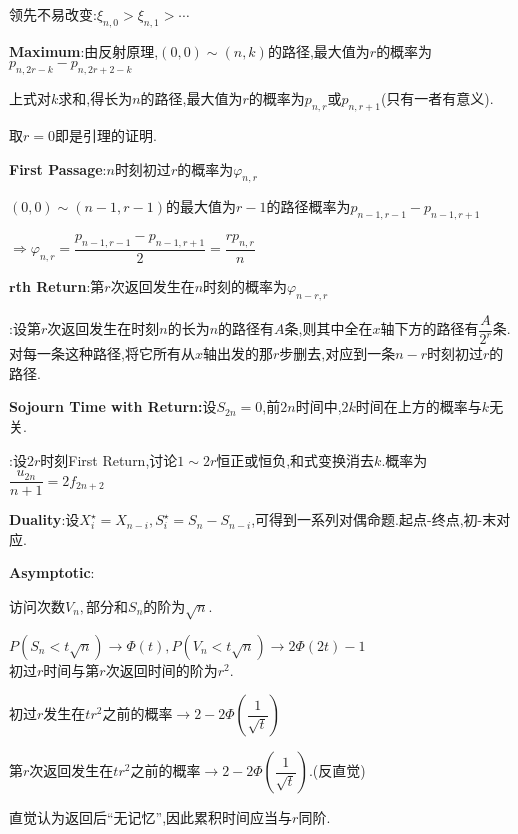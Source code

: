 领先不易改变:$ \xi_{n,0}>\xi_{n,1}>\cdots $
\vspace{0.6cm}

\textbf{Maximum}:由反射原理,$ (0,0)\sim (n,k)$的路径,最大值为$ r$的概率为$ p_{n,2r-k}-p_{n,2r+2-k}$

上式对$ k$求和,得长为$ n$的路径,最大值为$ r$的概率为$ p_{n,r}或p_{n,r+1}$(只有一者有意义).

取$ r=0$即是引理的证明.
\vspace{0.6cm}

\textbf{First Passage}:$ n$时刻初过$ r$的概率为$\varphi_{n,r}$

$(0,0)\sim (n-1,r-1) $的最大值为$ r-1$的路径概率为$ p_{n-1,r-1}-p_{n-1,r+1}$

$ \Rightarrow \varphi_{n,r} = \dfrac{p_{n-1,r-1}-p_{n-1,r+1}}{2} = \dfrac{rp_{n,r}}{n}$
\vspace{0.6cm}

\textbf{$ \mathbf{r}$th Return}:第$ r$次返回发生在$ n$时刻的概率为$ \varphi_{n-r,r}$

\proof:设第$ r$次返回发生在时刻$ n$的长为$ n$的路径有$ A$条,则其中全在$ x$轴下方的路径有$ \dfrac{A}{2^r}$条.
对每一条这种路径,将它所有从$ x$轴出发的那$ r$步删去,对应到一条$ n-r$时刻初过$ r$的路径.
\vspace{0.6cm}

\textbf{Sojourn Time with Return:}设$ S_{2n}=0$,前$ 2n$时间中,$ 2k$时间在上方的概率与$ k$无关.

\proof:设$ 2r$时刻First Return,讨论$ 1\sim 2r$恒正或恒负,和式变换消去$ k$.概率为$ \dfrac{u_{2n}}{n+1}=2f_{2n+2}$
\vspace{0.6cm}

\textbf{Duality}:设$ X_i^\star = X_{n-i},S_{i}^\star = S_n-S_{n-i}$,可得到一系列对偶命题.起点-终点,初-末对应.
\vspace{0.6cm}

\textbf{Asymptotic}:

访问次数$ V_n,$部分和$ S_n$的阶为$ \sqrt{n}.$

$  P(S_n < t\sqrt{n})\to \Phi(t), P(V_n < t\sqrt{n}) \to 2\Phi(2t) -1$
\\

初过$ r$时间与第$ r$次返回时间的阶为$ r^2$.

初过$ r$发生在$ tr^2$之前的概率$ \to 2 - 2 \Phi(\dfrac{1}{\sqrt{t}})$

第$ r$次返回发生在$ tr^2$之前的概率$ \to 2 - 2\Phi(\dfrac{1}{\sqrt{t}})$.(反直觉)

直觉认为返回后``无记忆'',因此累积时间应当与$ r$同阶.

